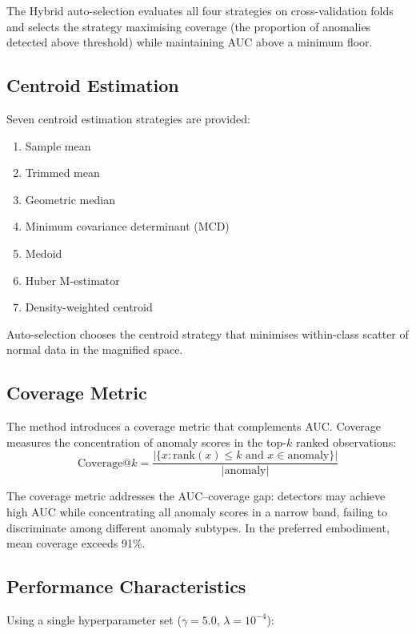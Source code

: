 \documentclass[12pt,a4paper]{article}
\begin{document}
The Hybrid auto-selection evaluates all four strategies on cross-validation 
folds and selects the strategy maximising coverage (the proportion of 
anomalies detected above threshold) while maintaining AUC above a minimum 
floor.

\subsection{Centroid Estimation}

Seven centroid estimation strategies are provided:
\begin{enumerate}
\item Sample mean
\item Trimmed mean
\item Geometric median
\item Minimum covariance determinant (MCD)
\item Medoid
\item Huber M-estimator
\item Density-weighted centroid
\end{enumerate}

Auto-selection chooses the centroid strategy that minimises within-class 
scatter of normal data in the magnified space.

\subsection{Coverage Metric}

The method introduces a coverage metric that complements AUC. Coverage 
measures the concentration of anomaly scores in the top-$k$ ranked 
observations:
\begin{equation}
\text{Coverage@}k = \frac{|\{x : \text{rank}(x) \leq k \text{ and } 
x \in \text{anomaly}\}|}{|\text{anomaly}|}
\end{equation}

The coverage metric addresses the AUC--coverage gap: detectors may achieve 
high AUC while concentrating all anomaly scores in a narrow band, failing 
to discriminate among different anomaly subtypes. In the preferred 
embodiment, mean coverage exceeds 91\%.

\subsection{Performance Characteristics}

Using a single hyperparameter set ($\gamma = 5.0$, $\lambda = 10^{-4}$):
\end{document}
